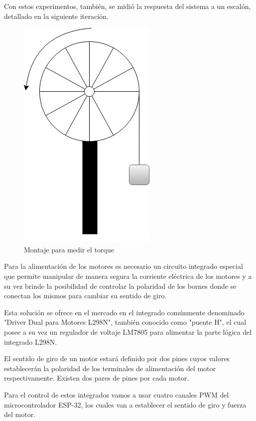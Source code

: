 Con estos experimentos, también, se midió la respuesta del sistema a un escalón, detallado en la siguiente iteración.

\begin{figure}[H]
    \centering
    \includegraphics[width=0.25\linewidth]{images/medicion_rpm.jpg}
    \caption{Montaje para medir el torque}
    \label{fig:medicion_torque}
\end{figure}

Para la alimentación de los motores es necesario un circuito integrado especial que permite manipular de manera segura la corriente eléctrica de los motores y a su vez brinde la posibilidad de controlar la polaridad de los bornes donde se conectan los mismos para cambiar su sentido de giro.

Esta solución se ofrece en el mercado en el integrado comúnmente denominado "Driver Dual para Motores L298N", también conocido como "puente H", el cual posee a su vez un regulador de voltaje LM7805 para alimentar la parte lógica del integrado L298N.

El sentido de giro de un motor estará definido por dos pines cuyos valores establecerán la polaridad de los terminales de alimentación del motor respectivamente. Existen dos pares de pines por cada motor.

Para el control de estos integrados vamos a usar cuatro canales PWM del microcontrolador ESP-32, los cuales van a establecer el sentido de giro y fuerza del motor.